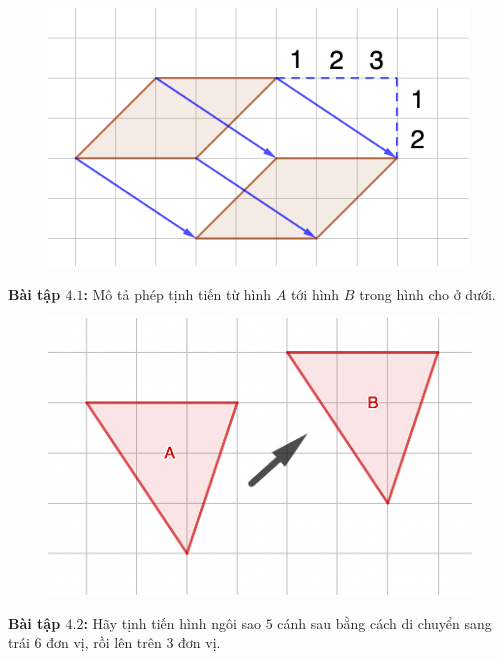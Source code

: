 \begin{multicols}{2}
	\begin{figure}[H]
		\vspace*{-5pt}
		\centering
		\captionsetup{labelformat= empty, justification=centering}
		\includegraphics[width= 1\linewidth]{Picture37}
		\vspace*{-10pt}
	\end{figure}
	\textbf{\color{toancuabi}Bài tập $\pmb{4.1}$:} Mô tả phép tịnh tiến từ hình $A$ tới hình $B$ trong hình cho ở dưới.
	\begin{figure}[H]
		\vspace*{-5pt}
		\centering
		\captionsetup{labelformat= empty, justification=centering}
		\includegraphics[width= 1\linewidth]{Picture38}
		\vspace*{-10pt}
	\end{figure}
	\textbf{\color{toancuabi}Bài tập $\pmb{4.2}$:} Hãy tịnh tiến hình ngôi sao $5$ cánh sau bằng cách di chuyển sang trái $6$ đơn vị, rồi lên trên $3$ đơn vị.
	\begin{figure}[H]

\end{figure}
\end{multicols}
